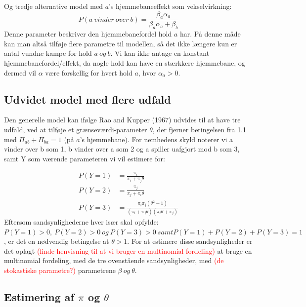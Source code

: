 \documentclass[11pt,a4paper]{article}
\begin{document}
Og tredje alternative model med $a$'s hjemmebaneeffekt som vekselvirkning:
\begin{equation}
P(a\ vinder\ over\ b) = \frac{\beta_a\alpha_a}{\beta_a\alpha_a+\beta_b}
\end{equation}
Denne parameter beskriver den hjemmebanefordel hold $a$ har. På denne måde kan man altså tilføje flere parametre til modellen, så det ikke længere kun er antal vundne kampe for hold $a \ og \ b$. Vi kan ikke antage en konstant hjemmebanefordel/effekt, da nogle hold kan have en stærkkere hjemmebane, og dermed vil $\alpha$ være forskellig for hvert hold $a$, hvor $\alpha_a>0$.
\\
\subsection{Udvidet model med flere udfald}
Den generelle model kan ifølge Rao and Kupper (1967) udvides til at have tre udfald, ved at tilføje et grænseværdi-parameter $\theta$, der fjerner betingelsen fra 1.1 med $\Pi_{ab}+\Pi_{ba}=1$ (på $a$'s hjemmebane). For nemhedens skyld noterer vi a vinder over b som 1, b vinder over a som 2 og a spiller uafgjort mod b som 3, samt Y som værende parameteren vi vil estimere for:

\begin{align*}
P(Y=1) &= \frac{\pi_i}{\pi_i+\pi_j\theta}\\
P(Y=2) &= \frac{\pi_j}{\pi_j+\pi_i\theta}\\
P(Y=3) &= \frac{\pi_i\pi_j(\theta^2-1)}{(\pi_i+\pi_j\theta)(\pi_i\theta+\pi_j)}
\end{align*}
Eftersom sandsynlighederne hver især skal opfylde:
$P(Y=1)>0, \ P(Y=2)>0\ og \ P(Y=3)>0\ samt P(Y=1)+P(Y=2)+P(Y=3)=1$, er det en nødvendig betingelse at $\theta>1$.
For at estimere disse sandsynligheder er det oplagt \textcolor{red}{(finde henvisning til at vi bruger en multinomial fordeling)} at bruge en multinomial fordeling, med de tre ovenstående sandsynligheder, med \textcolor{red}{(de stokastiske parametre?)} parametrene $\beta \ og \ \theta$. 

\subsection{Estimering af $\pi$ og $\theta$ }
\end{document}
